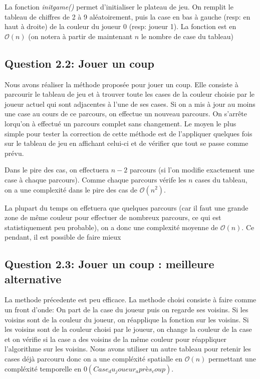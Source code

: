 \documentclass[11pt]{article}
\begin{document}
La fonction \textit{initgame()} permet d'initialiser le plateau de jeu. On remplit le tableau de chiffres de 2 à 9 aléatoirement, puis la case en bas à gauche (resp: en haut à droite) de la couleur du joueur 0 (resp: joueur 1). La fonction est en $\mathcal{O}(n)$ (on notera à partir de maintenant $n$ le nombre de case du tableau)

    \subsection{Question 2.2: Jouer un coup}
    Nous avons réaliser la méthode proposée pour jouer un coup. Elle consiste à parcourir le tableau de jeu et à trouver toute les cases de la couleur choisie par le joueur actuel qui sont adjacentes à l'une de ses cases. Si on a mis à jour au moins une case au cours de ce parcours, on effectue un nouveau parcours. On s'arrête lorqu'on à effectué un parcours complet sans changement. Le moyen le plus simple pour tester la correction de cette méthode est de l'appliquer quelques fois sur le tableau de jeu en affichant celui-ci et de vérifier que tout se passe comme prévu.

    Dans le pire des cas, on effectuera $n-2$ parcours (si l'on modifie exactement une case à chaque parcours). Comme chaque parcours vérife les $n$ cases du tableau, on a une complexité dans le pire des cas de $\mathcal{O}(n^2)$.

    La plupart du temps on effetuera que quelques parcours (car il faut une grande zone de même couleur pour effectuer de nombreux parcours, ce qui est statistiquement peu probable), on a donc une complexité moyenne de $\mathcal{O}(n)$. Ce pendant, il est possible de faire mieux

    \subsection{Question 2.3: Jouer un coup : meilleure alternative}
    La methode précedente est peu efficace. La methode choisi consiste à faire comme un front d'onde: On part de la case du joueur puis on regarde ses voisins. Si les voisins sont de la couleur du joueur, on réapplique la fonction sur les voisins. Si les voisins sont de la couleur choisi par le joueur, on change la couleur de la case et on vérifie si la case a des voisins de la même couleur pour réappliquer l'algorithme sur les voisins. Nous avons utiliser un autre tableau pour retenir les cases déjà parcouru donc on a une compléxité spatialle en $\mathcal{O}(n)$ permettant une compléxité temporelle en $\mathcal{0}(Case_du_joueur_après_coup)$.
\end{document}
